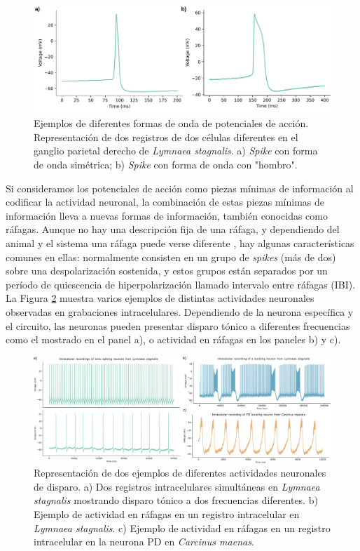 \begin{figure}[htb!]
	\centering
	\includegraphics[width=\linewidth]{img/intro/spike-types.pdf}
	\caption{Ejemplos de diferentes formas de onda de potenciales de acción. Representación de dos registros de dos células diferentes en el ganglio parietal derecho de \textit{Lymnaea stagnalis}. a) \textit{Spike} con forma de onda simétrica; b) \textit{Spike} con forma de onda con "hombro".}
	\label{fig:spike-types spanish}
\end{figure}

Si consideramos los potenciales de acción como piezas mínimas de información al codificar la actividad neuronal, la combinación de estas piezas mínimas de información lleva a nuevas formas de información, también conocidas como ráfagas. Aunque no hay una descripción fija de una ráfaga, y dependiendo del animal y el sistema una ráfaga puede verse diferente \parencite{russell_bursting_1978,palmu_detection_2010,lundqvist_gamma_2016}, hay algunas características comunes en ellas: normalmente consisten en un grupo de \textit{spikes} (más de dos) sobre una despolarización sostenida, y estos grupos están separados por un período de quiescencia de hiperpolarización llamado intervalo entre ráfagas (IBI). La Figura \ref{fig:spike_activity-types spanish} muestra varios ejemplos de distintas actividades neuronales observadas en grabaciones intracelulares. Dependiendo de la neurona específica y el circuito, las neuronas pueden presentar disparo tónico a diferentes frecuencias como el mostrado en el panel a), o actividad en ráfagas en los paneles b) y c).

\begin{figure}[htb!]
	\centering
	\includegraphics[width=\linewidth]{img/intro/spike_activity-types.png}
	\caption{Representación de dos ejemplos de diferentes actividades neuronales de disparo. a) Dos registros intracelulares simultáneas en \textit{Lymnaea stagnalis} mostrando disparo tónico a dos frecuencias diferentes. b) Ejemplo de actividad en ráfagas en un registro intracelular en \textit{Lymnaea stagnalis}. c) Ejemplo de actividad en ráfagas en un registro intracelular en la neurona PD en \textit{Carcinus maenas}.}
	\label{fig:spike_activity-types spanish}
\end{figure}

